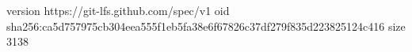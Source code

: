 version https://git-lfs.github.com/spec/v1
oid sha256:ca5d757975cb304eea555f1eb5fa38e6f67826c37df279f835d223825124c416
size 3138
